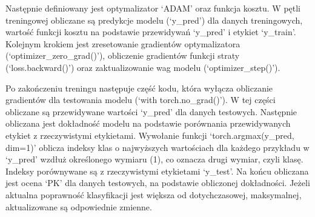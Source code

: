 \documentclass{article}
\begin{document}
Następnie definiowany jest optymalizator `ADAM' oraz funkcja kosztu.
W pętli treningowej obliczane są predykcje modelu (`y\_pred') dla danych treningowych, wartość funkcji kosztu na podstawie przewidywań `y\_pred' i etykiet `y\_train'.
Kolejnym krokiem jest zresetowanie gradientów optymalizatora (`optimizer\_zero\_grad()'), obliczenie gradientów funkcji straty (`loss.backward()') oraz zaktualizowanie wag modelu (`optimizer\_step()').

Po zakończeniu treningu następuje część kodu, która wyłącza obliczanie gradientów dla testowania modelu (`with torch.no\_grad()').
W tej części obliczane są przewidywane wartości `y\_pred' dla danych testowych.
Następnie obliczana jest dokładność modelu na podstawie porównania przewidywanych etykiet z rzeczywistymi etykietami.
Wywołanie funkcji `torch.argmax(y\_pred, dim=1)' oblicza indeksy klas o najwyższych wartościach dla każdego przykładu w `y\_pred' wzdłuż określonego wymiaru (1), co oznacza drugi wymiar, czyli klasę.
Indeksy porównywane są z rzeczywistymi etykietami `y\_test'.
Na końcu obliczana jest ocena `PK' dla danych testowych, na podstawie obliczonej dokładności.
Jeżeli aktualna poprawność klasyfikacji jest większa od dotychczasowej, maksymalnej, aktualizowane są odpowiednie zmienne.
\end{document}
